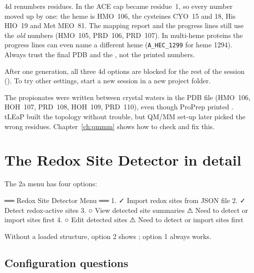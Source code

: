 \begin{watchout}
4d renumbers residues. In  the ACE cap
became residue~1, so every number moved up by one: the heme is HMO~106, the
cysteines CYO~15 and 18, His HIO~19 and Met MEO~81. The mapping report and the
progress lines still use the \emph{old} numbers (HMO~105, PRD~106, PRD~107).
In multi-heme proteins the progress lines can even name a different heme
(\texttt{A\_HEC\_1299} for heme 1294). Always trust the final PDB and the
, not the printed numbers.
\end{watchout}

\begin{watchout}
After one generation, all three 4d options are blocked for the rest of the
session (). To try other settings,
start a new session in a new project folder.
\end{watchout}

The propionates were written between crystal waters in the PDB file (HMO~106,
HOH~107, PRD~108, HOH~109, PRD~110), even though ProPrep printed
. tLEaP built the topology without trouble,
but QM/MM set-up later picked the wrong residues. Chapter~\ref{ch:qmmm} shows
how to check and fix this.

\section{The Redox Site Detector in detail}
\label{sec:redox-detector}

The 2a menu has four options:

\begin{screen}
══ Redox Site Detector Menu ══
  1. ✓ Import redox sites from JSON file
  2. ✓ Detect redox-active sites
  3. ○ View detected site summaries
       ⚠ Need to detect or import sites first
  4. ○ Edit detected sites
       ⚠ Need to detect or import sites first
\end{screen}

Without a loaded structure, option 2 shows ;
option 1 always works.

\subsection{Configuration questions}

